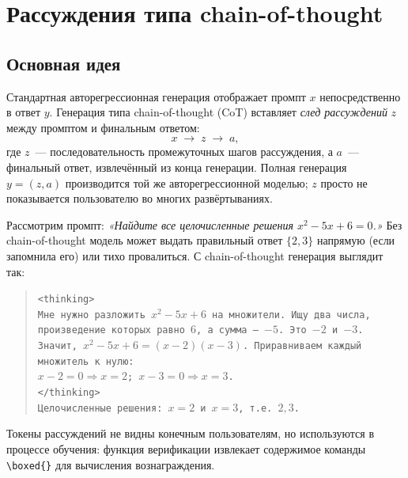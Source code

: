 \section{Рассуждения типа chain-of-thought}
\label{sec:cot}

\subsection{Основная идея}

Стандартная авторегрессионная генерация отображает промпт $x$ непосредственно в
ответ $y$. Генерация типа chain-of-thought (CoT)
вставляет \emph{след рассуждений} $z$ между
промптом и финальным ответом:
\[
x \;\longrightarrow\; z \;\longrightarrow\; a,
\]
где $z$~--- последовательность промежуточных шагов рассуждения, а $a$~--- финальный
ответ, извлечённый из конца генерации. Полная
генерация $y = (z, a)$ производится той же авторегрессионной моделью;
$z$ просто не показывается пользователю во многих развёртываниях.

\begin{example}
\label{ex:cot-math}
Рассмотрим промпт: \emph{«Найдите все целочисленные решения
$x^2 - 5x + 6 = 0$.»} Без chain-of-thought модель может выдать
правильный ответ $\{2, 3\}$ напрямую (если запомнила его) или
тихо провалиться. С chain-of-thought генерация выглядит так:

\begin{quote}
\texttt{<thinking>}\\
\texttt{Мне нужно разложить $x^2 - 5x + 6$ на множители. Ищу два числа,}\\
\texttt{произведение которых равно $6$, а сумма~--- $-5$. Это $-2$ и $-3$.}\\
\texttt{Значит, $x^2 - 5x + 6 = (x-2)(x-3)$. Приравниваем каждый множитель к нулю:}\\
\texttt{$x - 2 = 0 \Rightarrow x = 2$; $x - 3 = 0 \Rightarrow x = 3$.}\\
\texttt{</thinking>}\\
\texttt{Целочисленные решения: $x = 2$ и $x = 3$, т.е. $\boxed{2, 3}$.}
\end{quote}

Токены рассуждений не видны конечным пользователям, но используются
в процессе обучения: функция верификации извлекает содержимое
команды \texttt{\textbackslash boxed\{\}} для вычисления вознаграждения.
\end{example}

